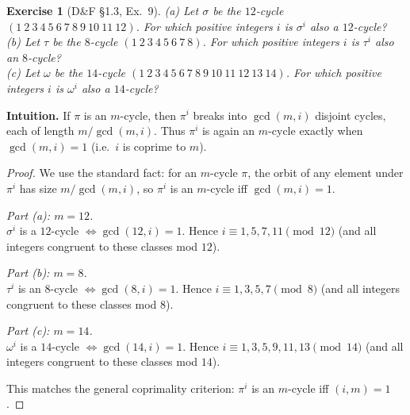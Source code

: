 \documentclass[12pt]{article}
\newtheorem{exercise}[theorem]{Exercise}
\theoremstyle{definition}
\begin{document}
\newpage

\begin{exercise}[D\&F §1.3, Ex.~9]
(a) Let $\sigma$ be the $12$-cycle $(1\ 2\ 3\ 4\ 5\ 6\ 7\ 8\ 9\ 10\ 11\ 12)$. For which positive integers $i$ is $\sigma^{i}$ also a $12$-cycle?\\
(b) Let $\tau$ be the $8$-cycle $(1\ 2\ 3\ 4\ 5\ 6\ 7\ 8)$. For which positive integers $i$ is $\tau^{i}$ also an $8$-cycle?\\
(c) Let $\omega$ be the $14$-cycle $(1\ 2\ 3\ 4\ 5\ 6\ 7\ 8\ 9\ 10\ 11\ 12\ 13\ 14)$. For which positive integers $i$ is $\omega^{i}$ also a $14$-cycle?
\end{exercise}

\dotfill

\noindent
\textbf{Intuition.}
If $\pi$ is an $m$-cycle, then $\pi^{i}$ breaks into $\gcd(m,i)$ disjoint cycles, each of length $m/\gcd(m,i)$.
Thus $\pi^{i}$ is again an $m$-cycle exactly when $\gcd(m,i)=1$ (i.e.\ $i$ is coprime to $m$).

\dotfill

\begin{proof}
We use the standard fact: for an $m$-cycle $\pi$, the orbit of any element under $\pi^{i}$ has size $m/\gcd(m,i)$,
so $\pi^{i}$ is an $m$-cycle iff $\gcd(m,i)=1$.

\dotfill

\noindent\emph{Part (a): $m=12$.}\\
$\sigma^{i}$ is a $12$-cycle $\Longleftrightarrow \gcd(12,i)=1$.
Hence $i\equiv 1,5,7,11 \pmod{12}$ (and all integers congruent to these classes mod $12$).

\dotfill

\noindent\emph{Part (b): $m=8$.}\\
$\tau^{i}$ is an $8$-cycle $\Longleftrightarrow \gcd(8,i)=1$.
Hence $i\equiv 1,3,5,7 \pmod{8}$ (and all integers congruent to these classes mod $8$).

\dotfill

\noindent\emph{Part (c): $m=14$.}\\
$\omega^{i}$ is a $14$-cycle $\Longleftrightarrow \gcd(14,i)=1$.
Hence $i\equiv 1,3,5,9,11,13 \pmod{14}$ (and all integers congruent to these classes mod $14$).

\dotfill

This matches the general coprimality criterion: $\pi^{i}$ is an $m$-cycle iff $(i,m)=1$.
\end{proof}
\end{document}
